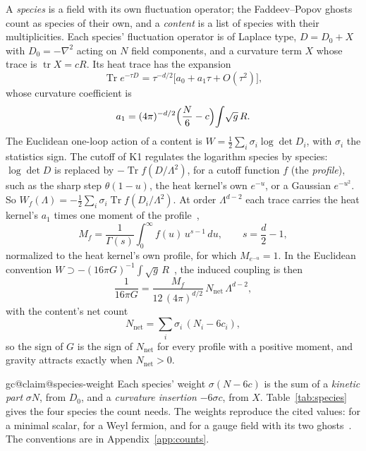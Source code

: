 \documentclass[aps,prd,reprint,amsmath,amssymb,superscriptaddress,nofootinbib]{revtex4-2}
\makeatletter
\newcommand{\Nnet}{N_{\mathrm{net}}}
\newcommand{\claim}[1]{\expandafter\xdef\csname igc@claim@#1\endcsname{\thesection}}
\makeatother
\begin{document}
A \emph{species} is a field with its own fluctuation operator; the Faddeev--Popov
ghosts count as species of their own, and a \emph{content} is a list of species with
their multiplicities. Each species' fluctuation operator is of Laplace type,
$D=D_0+X$ with $D_0=-\nabla^2$ acting on $N$ field components, and a curvature term
$X$ whose trace is $\operatorname{tr}X=cR$. Its heat trace has the
expansion~\cite{Vassilevich2003}
\begin{equation}
\operatorname{Tr}e^{-\tau D}=\tau^{-d/2}\bigl[a_0+a_1\tau+O(\tau^2)\bigr],
\label{eq:heat}
\end{equation}
whose curvature coefficient is
\begin{equation}
a_1=(4\pi)^{-d/2}\Bigl(\frac{N}{6}-c\Bigr)\!\int\!\sqrt{g}\,R .
\label{eq:a1}
\end{equation}
The Euclidean one-loop action of a content is
$W=\tfrac12\sum_i\sigma_i\log\det D_i$, with $\sigma_i$ the statistics sign. The
cutoff of K1 regulates the logarithm species by species: $\log\det D$ is replaced by
$-\operatorname{Tr}f(D/\Lambda^2)$, for a cutoff function $f$ (the \emph{profile}),
such as the sharp step $\theta(1-u)$, the heat kernel's own $e^{-u}$, or a Gaussian
$e^{-u^2}$. So $W_f(\Lambda)=-\tfrac12\sum_i\sigma_i\operatorname{Tr}f(D_i/\Lambda^2)$.
At order $\Lambda^{d-2}$ each trace carries the heat kernel's $a_1$ times one moment
of the profile~\cite{ChamseddineConnes1997,vanSuijlekom2024,EcksteinIochum2018,
EstradaGraciaBondiaVarilly1998},
\begin{equation}
M_f=\frac{1}{\Gamma(s)}\int_0^\infty f(u)\,u^{s-1}\,du ,\qquad s=\frac d2-1 ,
\label{eq:moment}
\end{equation}
normalized to the heat kernel's own profile, for which $M_{e^{-u}}=1$. In the
Euclidean convention $W\supset-(16\pi G)^{-1}\!\int\!\sqrt{g}\,R$~\cite{FrolovFursaevZelnikov1997},
the induced coupling is then
\begin{equation}
\frac{1}{16\pi G}=\frac{M_f}{12\,(4\pi)^{d/2}}\,\Nnet\,\Lambda^{d-2},
\label{eq:newton}
\end{equation}
with the content's net count
\begin{equation}
\Nnet=\sum_i\sigma_i\,(N_i-6c_i),
\label{eq:net}
\end{equation}
so the sign of $G$ is the sign of $\Nnet$ for every profile with a positive moment,
and gravity attracts exactly when $\Nnet>0$.

\claim{species-weight}%
Each species' weight $\sigma(N-6c)$ is the sum of a \emph{kinetic part} $\sigma N$,
from $D_0$, and a \emph{curvature insertion} $-6\sigma c$, from $X$.
Table~\ref{tab:species} gives the four species the count needs. The weights reproduce
the cited values: \weightScalar{} for a minimal scalar, \weightWeyl{} for a Weyl
fermion, and \weightGaugeField{} for a gauge field with its two
ghosts~\cite{BrodaSzanecki2009,Kabat1995}. The conventions are in
Appendix~\ref{app:counts}.
\end{document}
